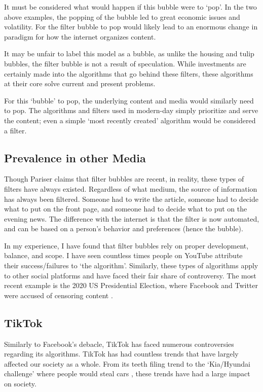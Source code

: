 \documentclass[12pt]{article}
\begin{document}
It must be considered what would happen if this bubble were to `pop'. In the two
above examples, the popping of the bubble led to great economic issues and
volatility. For the filter bubble to pop would likely lead to an enormous
change in paradigm for how the internet organizes content.

It may be unfair to label this model as a bubble, as unlike the housing and
tulip bubbles, the filter bubble is not a result of speculation. While
investments are certainly made into the algorithms that go behind these filters,
these algorithms at their core solve current and present problems.

For this `bubble' to pop, the underlying content and media would
similarly need to pop. The algorithms and filters used in modern-day simply
prioritize and serve the content; even a simple `most recently created'
algorithm would be considered a filter.

\subsection{Prevalence in other Media}
Though Pariser claims that filter bubbles are recent, in reality, these types of
filters have always existed. Regardless of what medium, the source of
information has always been filtered. Someone had to write the article, someone
had to decide what to put on the front page, and someone had to decide what to
put on the evening news. The difference with the internet is that the filter is
now automated, and can be based on a person's behavior and
preferences (hence the bubble).

In my experience, I have found that filter bubbles rely on proper development,
balance, and scope. I have seen countless times people on YouTube attribute
their success/failures to `the algorithm'. Similarly, these types of
algorithms apply to other social platforms and have faced their fair share of
controversy. The most recent example is the 2020 US Presidential Election, where
Facebook and Twitter were accused of censoring content \cite{time2021facebook}.

\subsection{TikTok}
Similarly to Facebook's debacle, TikTok has faced numerous controversies
regarding its algorithms. TikTok has had countless trends that have largely
affected our society as a whole. From its teeth filing trend \cite{wapostteeth}
to the `Kia/Hyundai challenge' where people would steal cars \cite{cnbccars},
these trends have had a large impact on society.
\end{document}
